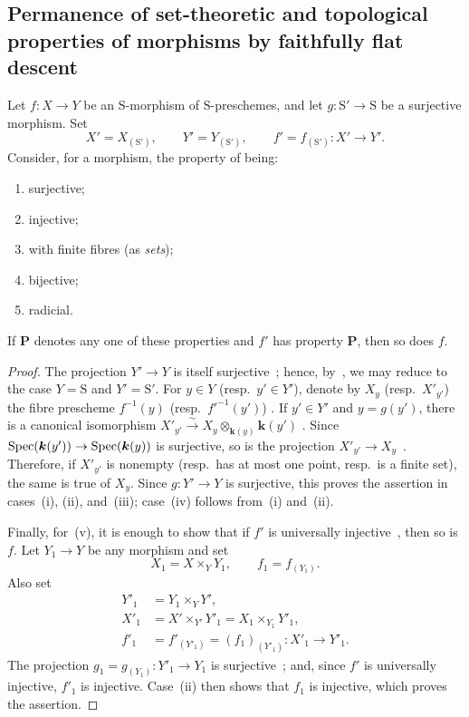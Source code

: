 
\subsection{Permanence of set-theoretic and topological properties of morphisms
by faithfully flat descent}
\label{subsection:IV.2.6}

\begin{proposition}[2.6.1]
\label{IV.2.6.1}
Let $f:X\to Y$ be an $\mathrm{S}$-morphism of $\mathrm{S}$-preschemes,
and let $g:\mathrm{S}'\to\mathrm{S}$ be a surjective morphism. Set
\[
  X'=X_{(\mathrm{S}')},\qquad
  Y'=Y_{(\mathrm{S}')},\qquad
  f'=f_{(\mathrm{S}')}:X'\to Y'.
\]
Consider, for a morphism, the property of being:
\begin{enumerate}
  \item[\textup{(i)}] surjective;
  \item[\textup{(ii)}] injective;
  \item[\textup{(iii)}] with finite fibres \textup{(as \emph{sets})};
  \item[\textup{(iv)}] bijective;
  \item[\textup{(v)}] radicial.
\end{enumerate}
If $\boldsymbol{P}$ denotes any one of these properties and $f'$ has
property $\boldsymbol{P}$, then so does $f$.
\end{proposition}

\begin{proof}
The projection $Y'\to Y$ is itself surjective~;
hence, by~, we may reduce to the case
$Y=\mathrm{S}$ and $Y'=\mathrm{S}'$. For $y\in Y$
\textnormal{(}resp.\ $y'\in Y'$\textnormal{)}, denote by $X_y$
\textnormal{(}resp.\ $X'_{y'}$\textnormal{)} the fibre prescheme
$f^{-1}(y)$ \textnormal{(}resp.\ $f'^{-1}(y')$\textnormal{)}
. If $y'\in Y'$ and $y=g(y')$, there is a canonical
isomorphism $X'_{y'}\xrightarrow{\sim}X_y\otimes_{\boldsymbol{k}(y)}\boldsymbol{k}(y')$
. Since
$\operatorname{Spec}(\boldsymbol{k}(y'))\to\operatorname{Spec}(\boldsymbol{k}(y))$ is surjective, so is the projection
$X'_{y'}\to X_y$~. Therefore, if $X'_{y'}$ is
nonempty \textnormal{(}resp.\ has at most one point, resp.\ is a finite
set\textnormal{)}, the same is true of $X_y$. Since $g:Y'\to Y$ is
surjective, this proves the assertion in cases~(i), (ii), and~(iii);
case~(iv) follows from~(i) and~(ii).

Finally, for~(v), it is enough to show that if $f'$ is universally
injective~, then so is $f$. Let $Y_1\to Y$ be any
morphism and set
\[
  X_1=X\times_Y Y_1,\qquad f_1=f_{(Y_1)}.
\]
Also set
\[
\begin{aligned}
  Y'_1&=Y_1\times_Y Y',\\
  X'_1&=X'\times_{Y'}Y'_1=X_1\times_{Y_1}Y'_1,\\
  f'_1&=f'_{(Y'_1)}=(f_1)_{(Y'_1)}:X'_1\to Y'_1.
\end{aligned}
\]
The projection $g_1=g_{(Y_1)}:Y'_1\to Y_1$ is
surjective~; and, since $f'$ is universally injective,
$f'_1$ is injective. Case~(ii) then shows that $f_1$ is injective,
which proves the assertion.
\end{proof}

